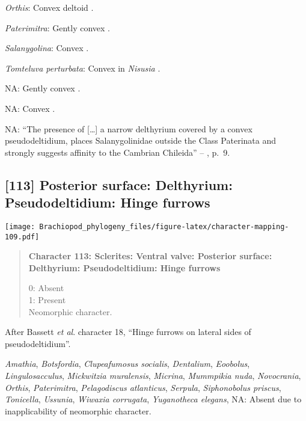 \documentclass[openany]{book}
\theoremstyle{definition}
\theoremstyle{definition}
\theoremstyle{definition}
\theoremstyle{remark}
\begin{document}
\hypertarget{Orthis-coding-112}{}
\emph{Orthis}: Convex deltoid \citep{Holmer2008TheEarly}.

\hypertarget{Paterimitra-coding-112}{}
\emph{Paterimitra}: Gently convex \citep[see][fig.
83.3]{Williams2000LinguliformeaCraniiformea}.

\hypertarget{Salanygolina-coding-112}{}
\emph{Salanygolina}: Convex \citep[see][fig.
4B]{Balthasar2004Shellstructure}.

\hypertarget{Tomteluva_perturbata-coding-112}{}
\emph{Tomteluva perturbata}: Convex in \emph{Nisusia} \citep[see][fig.
8.4]{Rowell1985Theevolutionary}.

\hypertarget{NA-coding-112}{}
NA: Gently convex \citep[see][fig.
83.1]{Williams2000LinguliformeaCraniiformea}.

\hypertarget{NA-coding-112}{}
NA: Convex \citep{Streng2016Anew}.

\hypertarget{NA-coding-112}{}
NA: ``The presence of {[}\ldots{}{]} a narrow delthyrium covered by a
convex pseudodeltidium, places Salanygolinidae outside the Class
Paterinata and strongly suggests affinity to the Cambrian Chileida'' --
\citet{Holmer2009Theenigmatic}, p.~9.

\subsection*{{[}113{]} Posterior surface: Delthyrium: Pseudodeltidium:
Hinge
furrows}\label{posterior-surface-delthyrium-pseudodeltidium-hinge-furrows}

\texttt{[image: Brachiopod\_phylogeny\_files/figure-latex/character-mapping-109.pdf]}

\begin{quote}
\textbf{Character 113: Sclerites: Ventral valve: Posterior surface:
Delthyrium: Pseudodeltidium: Hinge furrows}

0: Absent\\
1: Present\\
Neomorphic character.
\end{quote}

After Bassett \emph{et al}.
\citeyearpar{Bassett2001Functionalmorphology} character 18, ``Hinge
furrows on lateral sides of pseudodeltidium''.

\hypertarget{Amathia-coding-113}{}
\emph{Amathia}, \emph{Botsfordia}, \emph{Clupeafumosus socialis},
\emph{Dentalium}, \emph{Eoobolus}, \emph{Lingulosacculus},
\emph{Mickwitzia muralensis}, \emph{Micrina}, \emph{Mummpikia nuda},
\emph{Novocrania}, \emph{Orthis}, \emph{Paterimitra}, \emph{Pelagodiscus
atlanticus}, \emph{Serpula}, \emph{Siphonobolus priscus},
\emph{Tonicella}, \emph{Ussunia}, \emph{Wiwaxia corrugata},
\emph{Yuganotheca elegans}, NA: Absent due to inapplicability of
neomorphic character.
\end{document}
